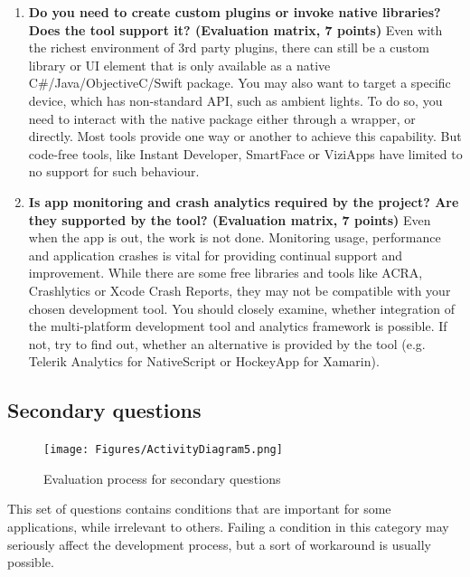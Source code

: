 \documentclass[english,master,public,dept460,male,cpdeclaration,oneside]{diploma}
\begin{document}
\begin{enumerate}
	\item \textbf{Do you need to create custom plugins or invoke native libraries? Does the tool support it? (Evaluation matrix, 7 points) }
	Even with the richest environment of 3rd party plugins, there can still be a custom library or UI element that is only available as a native C\#/Java/ObjectiveC/Swift package. You may also want to target a specific device, which has non-standard API, such as ambient lights. To do so, you need to interact with the native package either through a wrapper, or directly. Most tools provide one way or another to achieve this capability. But code-free tools, like Instant Developer, SmartFace or ViziApps have limited to no support for such behaviour.
	
	\item \textbf{Is app monitoring and crash analytics required by the project? Are they supported by the tool? (Evaluation matrix, 7 points) }
	Even when the app is out, the work is not done. Monitoring usage, performance and application crashes is vital for providing continual support and improvement. While there are some free libraries and tools like ACRA, Crashlytics or Xcode Crash Reports, they may not be compatible with your chosen development tool. You should closely examine, whether integration of the multi-platform development tool and analytics framework is possible. If not, try to find out, whether an alternative is provided by the tool (e.g. Telerik Analytics for NativeScript or HockeyApp for Xamarin).
\end{enumerate}

\subsection{Secondary questions}

\begin{figure}
	\centering\texttt{[image: Figures/ActivityDiagram5.png]}
	\caption{Evaluation process for secondary questions}
	\label{figure:activitySecondary}
\end{figure}

This set of questions contains conditions that are important for some applications, while irrelevant to others. Failing a condition in this category may seriously affect the development process, but a sort of workaround is usually possible.
\end{document}
